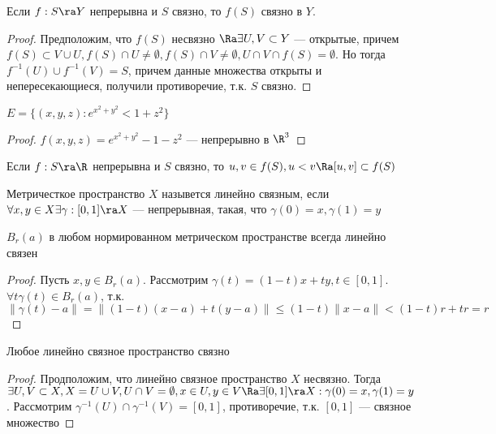 \begin{theorem}
    Если \(f: S \ra Y\) непрерывна и \(S\) связно, то \(f(S)\) связно в \(Y\).
\end{theorem}
\begin{proof}
    Предположим, что \(f(S)\) несвязно \(\Ra \exists U, V \subset Y\) --- открытые, причем \(f(S) \subset V \cup U, f(S) \cap U \ne \emptyset, f(S) \cap V \ne \emptyset, U \cap V \cap f(S) = \emptyset\). Но тогда \(f^{-1}(U) \cup f^{-1}(V) = S\), причем данные множества открыты и непересекающиеся, получили противоречие, т.к. \(S\) связно.
\end{proof}

\begin{example}
    \(E = \{(x, y, z) : e^{x^2 + y^2} < 1 + z^2\}\)
\end{example}
\begin{proof}
    \(f(x, y, z) = e^{x^2 + y^2} - 1 - z^2\) --- непрерывно в \(\R^3\)
\end{proof}

\begin{corollary}
    Если \(f: S \ra \R\) непрерывна и \(S\) связно, то \(u, v \in f(S), u < v \Ra [u, v] \subset f(S)\)
\end{corollary}

\begin{definition}
    Метричесткое пространство \(X\) назывется линейно связным, если \(\forall x, y \in X \exists \gamma: [0, 1] \ra X\) --- непрерывная, такая, что \(\gamma(0) = x, \gamma(1) = y\)
\end{definition}

\begin{example}
    \(B_r(a)\) в любом нормированном метрическом пространстве всегда линейно связен
\end{example}
\begin{proof}
    Пусть \(x, y \in B_r(a)\). Рассмотрим \(\gamma(t) = (1-t)x + ty, t \in [0, 1]\). \(\forall t \gamma(t) \in B_r(a)\), т.к. \(\|\gamma(t) - a\| = \|(1 - t)(x - a) + t(y - a)\| \le (1 - t)\|x - a\| < (1 - t)r + tr = r\)
\end{proof}

\begin{theorem}
    Любое линейно связное пространство связно
\end{theorem}
\begin{proof}
    Продположим, что линейно связное пространство \(X\) несвязно. Тогда \(\exists U, V \subset X, X = U \cup V, U \cap V = \emptyset, x \in U, y \in V \Ra \exists [0, 1] \ra X: \gamma(0) = x, \gamma(1) = y\). Рассмотрим \(\gamma^{-1}(U) \cap \gamma^{-1}(V) = [0, 1]\), противоречие, т.к. \([0, 1]\) --- связное множество
\end{proof}
